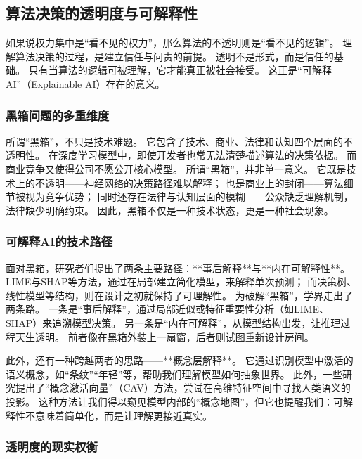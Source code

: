 \subsection{算法决策的透明度与可解释性}

如果说权力集中是“看不见的权力”，那么算法的不透明则是“看不见的逻辑”。  
理解算法决策的过程，是建立信任与问责的前提。  
透明不是形式，而是信任的基础。  
只有当算法的逻辑可被理解，它才能真正被社会接受。  
这正是“可解释AI”（Explainable AI）存在的意义。

\subsubsection{黑箱问题的多重维度}

所谓“黑箱”，不只是技术难题。  
它包含了技术、商业、法律和认知四个层面的不透明性。  
在深度学习模型中，即使开发者也常无法清楚描述算法的决策依据。  
而商业竞争又使得公司不愿公开核心模型。  
所谓“黑箱”，并非单一意义。  
它既是技术上的不透明——神经网络的决策路径难以解释；  
也是商业上的封闭——算法细节被视为竞争优势；  
同时还存在法律与认知层面的模糊——公众缺乏理解机制，法律缺少明确约束。  
因此，黑箱不仅是一种技术状态，更是一种社会现象。

\subsubsection{可解释AI的技术路径}

面对黑箱，研究者们提出了两条主要路径：**事后解释**与**内在可解释性**。  
LIME与SHAP等方法，通过在局部建立简化模型，来解释单次预测；  
而决策树、线性模型等结构，则在设计之初就保持了可理解性。  
为破解“黑箱”，学界走出了两条路。  
一条是“事后解释”，通过局部近似或特征重要性分析（如LIME、SHAP）来追溯模型决策。  
另一条是“内在可解释”，从模型结构出发，让推理过程天生透明。  
前者像在黑箱外装上一扇窗，后者则试图重新设计房间。

此外，还有一种跨越两者的思路——**概念层解释**。  
它通过识别模型中激活的语义概念，如“条纹”“年轻”等，帮助我们理解模型如何抽象世界。  
此外，一些研究提出了“概念激活向量”（CAV）方法，尝试在高维特征空间中寻找人类语义的投影。  
这种方法让我们得以窥见模型内部的“概念地图”，但它也提醒我们：可解释性不意味着简单化，而是让理解更接近真实。

\subsubsection{透明度的现实权衡}

